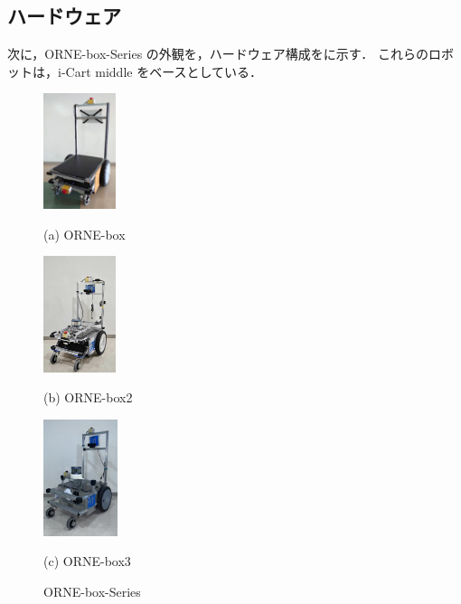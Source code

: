 \documentclass[twocolumn, 9pt]{jsproceedings}
\begin{document}
\subsection{ハードウェア}
次に，ORNE-box-Series の外観を，ハードウェア構成をに示す．
これらのロボットは，i-Cart middle をベースとしている．

\begin{figure}[h]
  \centering
  \begin{minipage}[b]{0.3\linewidth}
    \centering
    \includegraphics[width=21.1mm]{fig/box.pdf}
    \caption*{(a) ORNE-box}
  \end{minipage} 
  \hspace{-1.2mm}
  \begin{minipage}[b]{0.3\linewidth}
    \centering
    \includegraphics[height=34mm]{fig/box2.pdf}
    \caption*{(b) ORNE-box2}
  \end{minipage}
  \begin{minipage}[b]{0.3\linewidth}
    \centering
    \includegraphics[height=34mm]{fig/box3.pdf}
    \caption*{(c) ORNE-box3}
  \end{minipage}
  \caption{ORNE-box-Series}
  \label{fig:orne-series}
\end{figure}
\end{document}
